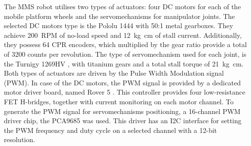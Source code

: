 The MMS robot utilises two types of actuators: four DC motors for each of the mobile platform wheels and the servomechanisms for manipulator joints. The selected DC motors type is the Pololu 1444 \cite{pololu} with 50:1 metal gearboxes. They achieve \SI{200}{RPM} of no-load speed and \SI{12}{\kilogram \centi\metre} of stall current. Additionally, they possess 64 CPR encoders, which multiplied by the gear ratio provide a total of 3200 counts per revolution. The type of servomechanism used for each joint, is the Turnigy 1269HV \cite{turnigy}, with titanium gears and a total stall torque of \SI{21}{\kilogram\centi\metre}. Both types of actuators are driven by the Pulse Width Modulation signal (PWM). In case of the DC motors, the PWM signal is provided by a dedicated motor driver board, named Rover 5 \cite{rover5}. This controller provides four low-resistance FET H-bridges, together with current monitoring on each motor channel. To generate the PWM signal for servomechanisms positioning, a 16-channel PWM driver chip, the PCA9685 \cite{pca9685} was used. This driver has an I2C interface for setting the PWM frequency and duty cycle on a selected channel with a 12-bit resolution.



